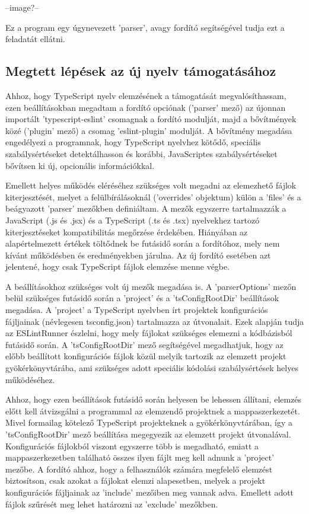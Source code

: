 --image?--

Ez a program egy úgynevezett 'parser', avagy fordító segítségével tudja ezt a feladatát ellátni.

\subsection{Megtett lépések az új nyelv támogatásához}

Ahhoz, hogy TypeScript nyelv elemzésének a támogatását megvalósíthassam, ezen beállításokban megadtam a fordító opciónak ('parser' mező) az újonnan importált 'typescript-eslint' csomagnak a  fordító modulját, majd a bővítmények közé ('plugin' mező) a csomag 'eslint-plugin' modulját. 
A bővítmény megadása engedélyezi a programnak, hogy TypeScript nyelvhez kötődő, speciális szabálysértéseket detektálhasson és korábbi, JavaScriptes szabálysértéseket bővítsen ki új, opcionális információkkal. 

Emellett helyes működés eléréséhez szükséges volt megadni az elemezhető fájlok kiterjesztését, melyet a felülbírálásoknál ('overrides' objektum) külön a 'files' és a beágyazott 'parser' mezőkben definiáltam. A mezők egyszerre tartalmazzák a JavaScript (.js és .jsx) és a TypeScript (.ts és .tsx) nyelvekhez tartozó kiterjesztéseket kompatibilitás megőrzése érdekében. Hiányában az alapértelmezett értékek töltődnek be futásidő során a fordítóhoz, mely nem kívánt működésben és eredményekben járulna. Az új fordító esetében azt jelentené, hogy csak TypeScript fájlok elemzése menne végbe.

A beállításokhoz szükséges volt új mezők megadása is. A 'parserOptions' mezőn belül szükséges futásidő során a 'project' és a 'tsConfigRootDir' beállítások megadása. A 'project' a TypeScript nyelvben írt projektek konfigurációs fájljainak (névlegesen tsconfig.json) tartalmazza az útvonalait. Ezek alapján tudja az ESLintRunner észlelni, hogy mely fájlokat szükséges elemezni a kódbázisból futásidő során. A 'tsConfigRootDir' mező segítségével megadhatjuk, hogy az előbb beállított konfigurációs fájlok közül melyik tartozik az elemzett projekt gyökérkönyvtárába, ami szükséges adott speciális kódolási szabálysértések helyes működéséhez.

Ahhoz, hogy ezen beállítások futásidő során helyesen be lehessen állítani, elemzés előtt kell átvizsgálni a programmal az elemzendő projektnek a mappaszerkezetét. Mivel formailag kötelező TypeScript projekteknek a gyökérkönyvtárában, így a 'tsConfigRootDir' mező beállítása megegyezik az elemzett projekt útvonalával. Konfigurációs fájlokból viszont egyszerre több is megadható, emiatt a mappaszerkezetben található összes ilyen fájlt meg kell adnunk a 'project' mezőbe. 
A fordító ahhoz, hogy a felhasználók számára megfelelő elemzést biztosítson, csak azokat a fájlokat elemzi alapesetben, melyek a projekt konfigurációs fájljainak az 'include' mezőiben meg vannak adva. Emellett adott fájlok szűrését meg lehet határozni az 'exclude' mezőkben.

